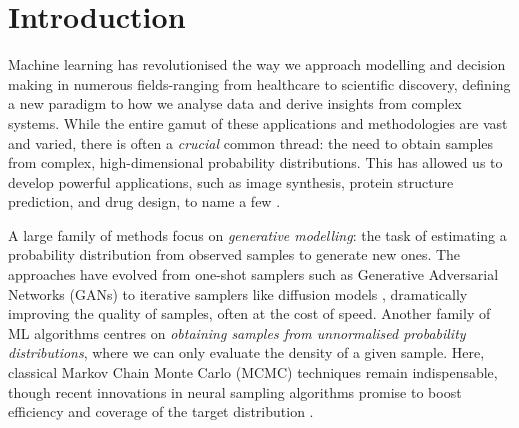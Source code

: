 
\chapter{Introduction}  %
\label{chapter:introduction}
\ifpdf
    \graphicspath{{Chapter1/Figs/Raster/}{Chapter1/Figs/PDF/}{Chapter1/Figs/}}
\else
    \graphicspath{{Chapter1/Figs/Vector/}{Chapter1/Figs/}}
\fi

Machine learning has revolutionised the way we approach modelling and decision making in numerous fields-ranging from healthcare to scientific discovery, defining a new paradigm to how we analyse data and derive insights from complex systems. While the entire gamut of these applications and methodologies are vast and varied, there is often a \emph{crucial} common thread: the need to obtain samples from complex, high-dimensional probability distributions. This has allowed us to develop powerful applications, such as image synthesis, protein structure prediction, and drug design, to name a few \citep{jumper2021highly, larson2019evaluation, gupta2021deep, roy2022does}. 

A large family of methods focus on \textit{generative modelling}: the task of estimating a probability distribution from observed samples to generate new ones. The approaches have evolved from one-shot samplers such as Generative Adversarial Networks (GANs) \citep{goodfellow2014generative} to iterative samplers like diffusion models \citep{ho2020denoising, song2020score}, dramatically improving the quality of samples, often at the cost of speed. Another family of ML algorithms centres on \textit{obtaining samples from unnormalised probability distributions}, where we can only evaluate the density of a given sample. Here, classical Markov Chain Monte Carlo (MCMC) techniques remain indispensable, though recent innovations in neural sampling algorithms promise to boost efficiency and coverage of the target distribution \citep{doucet2022score, zhang2022fast, vargas2023denoising}.


